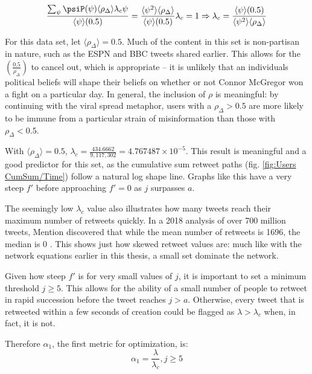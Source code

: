 \documentclass[NETN,manuscript]{stjour-new}
\begin{document}
\begin{equation}
\label{critical value equation}
    \frac{\sum_{\psi} \psiP(\psi)\langle\rho_{\Delta}\rangle\lambda_c\psi}{\langle \psi \rangle(0.5)} = \frac{\langle \psi^2 \rangle\langle\rho_{\Delta}\rangle}{\langle \psi \rangle(0.5)}\lambda_c = 1 \Rightarrow \lambda_c = \frac{\langle \psi \rangle(0.5)}{\langle \psi^2 \rangle\langle\rho_{\Delta}\rangle}
\end{equation}

For this data set, let $\langle \rho_{\Delta} \rangle = 0.5$. Much of the content in this set is non-partisan in nature, such as the ESPN and BBC tweets shared earlier. This allows for the $\left(\frac{0.5}{\rho_{\Delta}}\right)$ to cancel out, which is appropriate -- it is unlikely that an individuals political beliefs will shape their beliefs on whether or not Connor McGregor won a fight on a particular day. In general, the inclusion of $\rho$ is meaningful: by continuing with the viral spread metaphor, users with a $\rho_{\Delta} > 0.5$ are more likely to be immune from a particular strain of misinformation than those with  $\rho_{\Delta} < 0.5$.

With $\langle \rho_{\Delta} \rangle = 0.5$, $\lambda_c = \frac{434.6662}{9,117,302}=4.767487\times 10^{-5}$. This result is meaningful and a good predictor for this set, as the cumulative sum retweet paths (fig. \ref{fig:Users CumSum/Time}) follow a natural log shape line. Graphs like this have a very steep $f'$ before approaching $f' = 0$ as $j$ surpasses $a$. 

The seemingly low $\lambda_c$ value also illustrates how many tweets reach their maximum number of retweets quickly. In a 2018 analysis of over 700 million tweets, Mention discovered that while the mean number of retweets is 1696, the median is 0 \citep{mention2018twitter}. This shows just how skewed retweet values are: much like with the network equations earlier in this thesis, a small set dominate the network.

Given how steep $f'$ is for very small values of $j$, it is important to set a minimum threshold $j \geq 5$. This allows for the ability of a small number of people to retweet in rapid succession before the tweet reaches $j > a$. Otherwise, every tweet that is retweeted within a few seconds of creation could be flagged as $\lambda > \lambda_c$ when, in fact, it is not.

Therefore $\alpha_1$, the first metric for optimization, is:
\begin{equation}
    \label{alpha1}
    \alpha_1 = \frac{\lambda}{\lambda_c}, j\geq 5
\end{equation}
\end{document}
